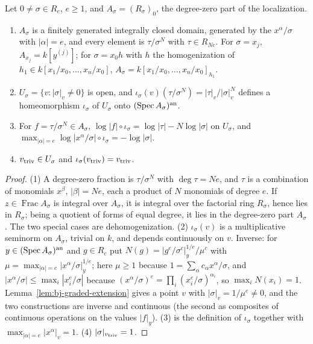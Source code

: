 \begin{lemma}\label{lem:bj-chart}
\leanok
{}
Let $0\ne\sigma\in R_e$, $e\ge1$, and $A_\sigma=(R_\sigma)_0$, the degree-zero part of the localization.
\begin{enumerate}
\item $A_\sigma$ is a finitely generated integrally closed domain, generated by the $x^\alpha/\sigma$ with
$|\alpha|=e$, and every element is $\tau/\sigma^N$ with $\tau\in R_{Ne}$. For $\sigma=x_j$,
$A_{x_j}=k[y^{(j)}]$; for $\sigma=x_0h$ with $h$ the homogenization of $h_1\in k[x_1/x_0,\dots,x_n/x_0]$,
$A_\sigma=k[x_1/x_0,\dots,x_n/x_0]_{h_1}$.
\item $U_\sigma=\{v:|\sigma|_v\ne0\}$ is open, and $\iota_\sigma(v)(\tau/\sigma^N)=|\tau|_v/|\sigma|_v^N$
defines a homeomorphism $\iota_\sigma$ of $U_\sigma$ onto $(\operatorname{Spec} A_\sigma)^{\mathrm{an}}$.
\item For $f=\tau/\sigma^N\in A_\sigma$, $\log|f|\circ\iota_\sigma=\log|\tau|-N\log|\sigma|$ on $U_\sigma$, and
$\max_{|\alpha|=e}\log|x^\alpha/\sigma|\circ\iota_\sigma=-\log|\sigma|$.
\item $v_{\mathrm{triv}}\in U_\sigma$ and $\iota_\sigma(v_{\mathrm{triv}})=v_{\mathrm{triv}}$.
\end{enumerate}
\end{lemma}

\begin{proof}
(1) A degree-zero fraction is $\tau/\sigma^N$ with $\deg\tau=Ne$, and $\tau$ is a combination of monomials
$x^\beta$, $|\beta|=Ne$, each a product of $N$ monomials of degree $e$. If $z\in\operatorname{Frac}A_\sigma$
is integral over $A_\sigma$, it is integral over the factorial ring $R_\sigma$, hence lies in
$R_\sigma$; being a quotient of forms of equal degree, it lies in the degree-zero part $A_\sigma$. The two special cases are dehomogenization. (2) $\iota_\sigma(v)$ is a
multiplicative seminorm on $A_\sigma$, trivial on $k$, and depends continuously on $v$. Inverse: for
$y\in(\operatorname{Spec} A_\sigma)^{\mathrm{an}}$ and $g\in R_c$ put
$N(g)=|g^e/\sigma^c|_y^{1/e}/\mu^c$ with $\mu=\max_{|\alpha|=e}|x^\alpha/\sigma|_y^{1/e}$; here $\mu\ge1$ because
$1=\sum_\alpha c_\alpha x^\alpha/\sigma$, and $|x^\alpha/\sigma|\le\max_i|x_i^e/\sigma|$ because
$(x^\alpha/\sigma)^e=\prod_i(x_i^e/\sigma)^{\alpha_i}$, so $\max_iN(x_i)=1$. Lemma~\ref{lem:bj-graded-extension}
gives a point $v$ with $|\sigma|_v=1/\mu^e\ne0$, and the two constructions are inverse and continuous (the
second as composites of continuous operations on the values $|f|_y$). (3) is the definition of $\iota_\sigma$
together with $\max_{|\alpha|=e}|x^\alpha|_v=1$. (4) $|\sigma|_{v_{\mathrm{triv}}}=1$.
\end{proof}

